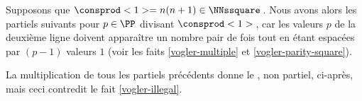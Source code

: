Supposons que $\consprod<1> = n(n+1) \in \NNssquare$\,. Nous avons alors les \sftab[x] partiels suivants pour $p \in \PP$ divisant $\consprod<1>$\,, car les valeurs $p$ de la deuxième ligne doivent apparaître un nombre pair de fois tout en étant espacées par $(p-1)$ valeurs $1$ (voir les faits \ref{vogler-multiple} et \ref{vogler-parity-square}). 

\begin{center}
\end{center}


La multiplication de tous les \sftab[x] partiels précédents donne le \sftab, non partiel, ci-après, mais ceci contredit le fait \ref{vogler-illegal}.

\begin{center}
\end{center}
